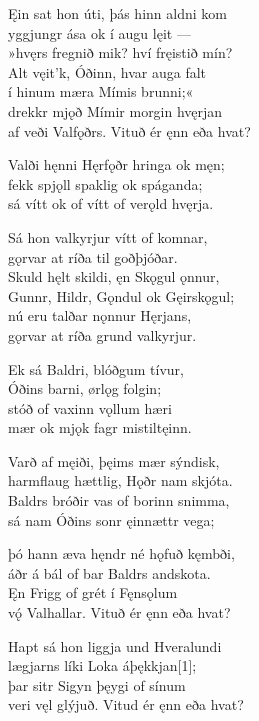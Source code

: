 \bva Ęin sat hon úti, \hld þás hinn aldni kom \\
yggjungr ása \hld ok í augu lęit — \\
»hvęrs fregnið mik? \hld hví fręistið mín? \\
Alt vęit'k, Óðinn, \hld hvar auga falt \\
í hinum mæra \hld Mímis brunni;« \\
drekkr mjǫð Mímir \hld morgin hvęrjan \\
af veði Valfǫðrs. \hld Vituð ér ęnn eða hvat?

\bva Valði hęnni Hęrfǫðr \hld hringa ok męn; \\
fekk spjǫll spaklig \hld ok spáganda; \\
sá vítt ok of vítt \hld of verǫld hvęrja.

\bva Sá hon valkyrjur \hld vítt of komnar, \\
gǫrvar at ríða \hld til goðþjóðar. \\
Skuld hęlt skildi, \hld ęn Skǫgul ǫnnur, \\
Gunnr, Hildr, Gǫndul \hld ok Gęirskǫgul; \\
nú eru talðar \hld nǫnnur Hęrjans, \\
gǫrvar at ríða \hld grund valkyrjur.

\bva Ek sá Baldri, \hld blóðgum tívur, \\
Óðins barni, \hld ørlǫg folgin; \\
stóð of vaxinn \hld vǫllum hæri \\
mær ok mjǫk fagr \hld mistiltęinn.

\bva Varð af męiði, \hld þęims mær sýndisk, \\
harmflaug hættlig, \hld Hǫðr nam skjóta. \\
Baldrs bróðir vas \hld of borinn snimma, \\
sá nam Óðins sonr \hld ęinnættr vega;

\bva þó hann æva hęndr \hld né hǫfuð kęmbði, \\
áðr á bál of bar \hld Baldrs andskota. \\
Ęn Frigg of grét \hld í Fęnsǫlum \\
vǫ́ Valhallar. \hld Vituð ér ęnn eða hvat?

\bva Hapt sá hon liggja \hld und Hveralundi \\
lægjarns líki \hld Loka áþękkjan[1]; \\
þar sitr Sigyn \hld þęygi of sínum \\
veri vęl glýjuð. \hld Vitud ér ęnn eða hvat?

